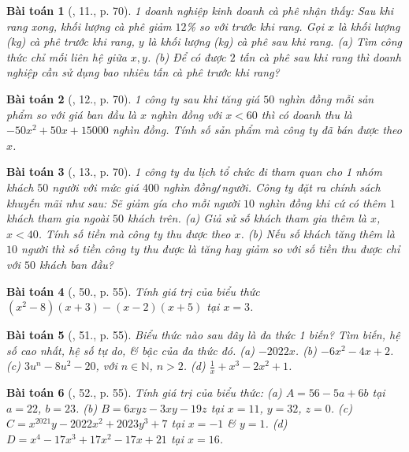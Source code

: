 \documentclass{article}
\newtheorem{baitoan}{Bài toán}
\begin{document}
\begin{baitoan}[\cite{SGK_Toan_7_Canh_Dieu_tap_2}, 11., p. 70]
	1 doanh nghiệp kinh doanh cà phê nhận thấy: Sau khi rang xong, khối lượng cà phê giảm $12$\%  so với trước khi rang. Gọi $x$ là khối lượng (kg) cà phê trước khi rang, $y$ là khối lượng (kg) cà phê sau khi rang. (a) Tìm công thức chỉ mối liên hệ giữa $x,y$. (b) Để có được $2$ tấn cà phê sau khi rang thì doanh nghiệp cần sử dụng bao nhiêu tấn cà phê trước khi rang?
\end{baitoan}

\begin{baitoan}[\cite{SGK_Toan_7_Canh_Dieu_tap_2}, 12., p. 70]
	1 công ty sau khi tăng giá $50$ nghìn đồng mỗi sản phẩm so với giá ban đầu là $x$ nghìn đồng với $x < 60$ thì có doanh thu là $-50x^2 + 50x + 15000$ nghìn đồng. Tính số sản phẩm mà công ty đã bán được theo $x$.
\end{baitoan}

\begin{baitoan}[\cite{SGK_Toan_7_Canh_Dieu_tap_2}, 13., p. 70]
	1 công ty du lịch tổ chức đi tham quan cho 1 nhóm khách $50$ người với mức giá $400$ nghìn đồng\emph{\texttt{/}}người. Công ty đặt ra chính sách khuyến mãi như sau: Sẽ giảm gía cho mỗi người $10$ nghìn đồng khi cứ có thêm $1$ khách tham gia ngoài $50$ khách trên. (a) Giả sử số khách tham gia thêm là $x$, $x < 40$. Tính số tiền mà công ty thu được theo $x$. (b) Nếu số khách tăng thêm là $10$ người thì số tiền công ty thu được là tăng hay giảm so với số tiền thu được chỉ với $50$ khách ban đầu?
\end{baitoan}

\begin{baitoan}[\cite{SBT_Toan_7_Canh_Dieu_tap_2}, 50., p. 55]
	Tính giá trị của biểu thức $(x^2 - 8)(x + 3) - (x - 2)(x + 5)$ tại $x = 3$.
\end{baitoan}

\begin{baitoan}[\cite{SBT_Toan_7_Canh_Dieu_tap_2}, 51., p. 55]
	Biểu thức nào sau đây là đa thức 1 biến? Tìm biến, hệ số cao nhất, hệ số tự do, \& bậc của đa thức đó. (a) $-2022x$. (b) $-6x^2 - 4x + 2$. (c) $3u^n - 8u^2 - 20$, với $n\in\mathbb{N}$, $n > 2$. (d) $\frac{1}{x} + x^3 - 2x^2 + 1$.
\end{baitoan}

\begin{baitoan}[\cite{SBT_Toan_7_Canh_Dieu_tap_2}, 52., p. 55]
	Tính giá trị của biểu thức: (a) $A = 56 - 5a + 6b$ tại $a = 22$, $b = 23$. (b) $B = 6xyz - 3xy - 19z$ tại $x = 11$, $y = 32$, $z = 0$. (c) $C = x^{2021}y - 2022x^2 + 2023y^3 + 7$ tại $x = -1$ \& $y = 1$. (d) $D = x^4 - 17x^3 + 17x^2 - 17x + 21$ tại $x = 16$.
\end{baitoan}
\end{document}
